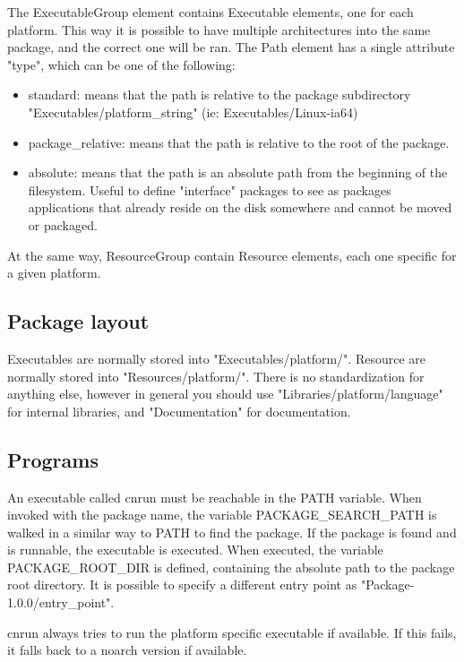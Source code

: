 The ExecutableGroup element contains Executable elements, one for each platform.
This way it is possible to have multiple architectures into the same package,
and the correct one will be ran. The Path element has a single attribute
"type", which can be one of the following:
\begin{itemize}
\item standard: means that the path is relative to the package subdirectory "Executables/platform\_string" (ie: Executables/Linux-ia64)
\item package\_relative: means that the path is relative to the root of the package.
\item absolute: means that the path is an absolute path from the beginning of
      the filesystem. Useful to define "interface" packages to see as packages 
      applications that already reside on the disk somewhere and cannot be moved or packaged.
\end{itemize}

At the same way, ResourceGroup contain Resource elements, each one specific for a given platform.

\subsection{Package layout}

Executables are normally stored into "Executables/platform/". Resource are normally stored into "Resources/platform/".
There is no standardization for anything else, however in general you should use "Libraries/platform/language" for internal libraries,
and "Documentation" for documentation.

\subsection{Programs}

An executable called cnrun must be reachable in the PATH variable. When
invoked with the package name, the variable PACKAGE\_SEARCH\_PATH is walked in
a similar way to PATH to find the package.  If the package is found and is
runnable, the executable is executed. When executed, the variable
PACKAGE\_ROOT\_DIR is defined, containing the absolute path to the package root
directory.  It is possible to specify a different entry point as
"Package-1.0.0/entry\_point".

cnrun always tries to run the platform specific executable if available. If
this fails, it falls back to a noarch version if available.


